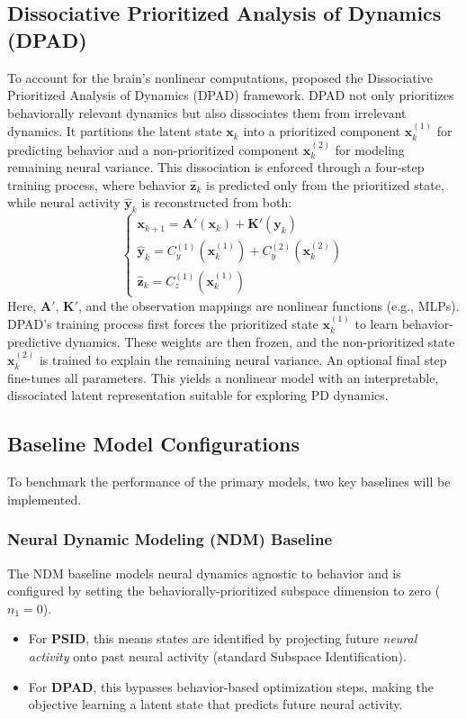 \documentclass[12pt, a4paper]{article}
\begin{document}
\subsection{Dissociative Prioritized Analysis of Dynamics (DPAD)}
To account for the brain's nonlinear computations, \textcite{saniDissociativePrioritizedModeling2024} proposed the Dissociative Prioritized Analysis of Dynamics (DPAD) framework. DPAD not only prioritizes behaviorally relevant dynamics but also dissociates them from irrelevant dynamics. It partitions the latent state $\mathbf{x}_k$ into a prioritized component $\mathbf{x}_k^{(1)}$ for predicting behavior and a non-prioritized component $\mathbf{x}_k^{(2)}$ for modeling remaining neural variance.
This dissociation is enforced through a four-step training process, where behavior $\hat{\mathbf{z}}_k$ is predicted only from the prioritized state, while neural activity $\hat{\mathbf{y}}_k$ is reconstructed from both:
$$
    \begin{cases}
        \mathbf{x}_{k+1} = \mathbf{A}'(\mathbf{x}_k) + \mathbf{K}'(\mathbf{y}_k)           \\
        \hat{\mathbf{y}}_k = C_y^{(1)}(\mathbf{x}_k^{(1)}) + C_y^{(2)}(\mathbf{x}_k^{(2)}) \\
        \hat{\mathbf{z}}_k = C_z^{(1)}(\mathbf{x}_k^{(1)})
    \end{cases}
$$
Here, $\mathbf{A}'$, $\mathbf{K}'$, and the observation mappings are nonlinear functions (e.g., MLPs). DPAD's training process first forces the prioritized state $\mathbf{x}_k^{(1)}$ to learn behavior-predictive dynamics. These weights are then frozen, and the non-prioritized state $\mathbf{x}_k^{(2)}$ is trained to explain the remaining neural variance. An optional final step fine-tunes all parameters. This yields a nonlinear model with an interpretable, dissociated latent representation suitable for exploring PD dynamics.


\subsection{Baseline Model Configurations}
To benchmark the performance of the primary models, two key baselines will be implemented.

\subsubsection{Neural Dynamic Modeling (NDM) Baseline}
The NDM baseline models neural dynamics agnostic to behavior and is configured by setting the behaviorally-prioritized subspace dimension to zero ($n_1 = 0$).
    \begin{itemize}
        \item For \textbf{PSID}, this means states are identified by projecting future \textit{neural activity} onto past neural activity (standard Subspace Identification).
        \item For \textbf{DPAD}, this bypasses behavior-based optimization steps, making the objective learning a latent state that predicts future neural activity.
    \end{itemize}
\end{document}
